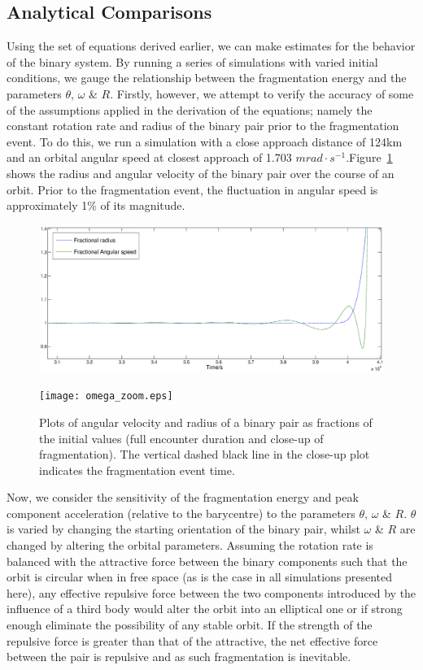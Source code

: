\documentclass[letterpaper, preprint, paper,11pt]{AAS}	%
\begin{document}
\subsection{Analytical Comparisons}

Using the set of equations derived earlier, we can make estimates for the behavior of the binary system. By running a series of simulations with varied initial conditions, we gauge the relationship between the fragmentation energy and the parameters $\theta$, $\omega$ \& $R$. Firstly, however, we attempt to verify the accuracy of some of the assumptions applied in the derivation of the equations; namely the constant rotation rate and radius of the binary pair prior to the fragmentation event. To do this, we run a simulation with a close approach distance of 124km and an orbital angular speed at closest approach of 1.703 $mrad \cdot s^{-1}$.Figure~\ref{fig:omega} shows the radius and angular velocity of the binary pair over the course of an orbit. Prior to the fragmentation event, the fluctuation in angular speed is approximately 1\% of its magnitude.

\begin{center}
\begin{figure}[H]
\centering
\centerline{\includegraphics[width=1.2\textwidth]{omega.eps}} 
\centerline{\texttt{[image: omega\_zoom.eps]}} 
\caption{Plots of angular velocity and radius of a binary pair as fractions of the initial values (full encounter duration and close-up of fragmentation). The vertical dashed black line in the close-up plot indicates the fragmentation event time.} 
\label{fig:omega}
\end{figure}
\end{center}

Now, we consider the sensitivity of the fragmentation energy and peak component acceleration (relative to the barycentre) to the parameters $\theta$, $\omega$ \& $R$. $\theta$ is varied by changing the starting orientation of the binary pair, whilst $\omega$ \& $R$ are changed by altering the orbital parameters. Assuming the rotation rate is balanced with the attractive force between the binary components such that the orbit is circular when in free space (as is the case in all simulations presented here), any effective repulsive force between the two components introduced by the influence of a third body would alter the orbit into an elliptical one or if strong enough eliminate the possibility of any stable orbit. If the strength of the repulsive force is greater than that of the attractive, the net effective force between the pair is repulsive and as such fragmentation is inevitable. 
\end{document}
